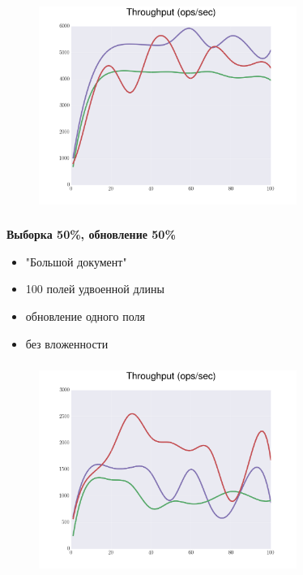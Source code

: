 \documentclass[18pt, compress, aspectratio=169]{beamer}
\begin{document}
\begin{frame}
    \frametitle{}
    \begin{center}
    \begin{figure}
        \includegraphics[width=0.75\textwidth,center]{benchmarks/workload_a_journaled/throughput.png}
    \end{figure}
    \end{center}
\end{frame}

\begin{frame}
    \frametitle{}
    \begin{center}
        \textbf{Выборка 50\%, обновление 50\%}
        \begin{itemize}[label={}]
            \item "Большой документ"
            \item 100 полей удвоенной длины
            \item обновление одного поля
            \item без вложенности
        \end{itemize}
    \end{center}
\end{frame}

\begin{frame}
    \frametitle{}
    \begin{center}
    \begin{figure}
        \includegraphics[width=0.75\textwidth,center]{benchmarks/workload_a_large_document/throughput.png}
    \end{figure}
    \end{center}
\end{frame}
\end{document}
